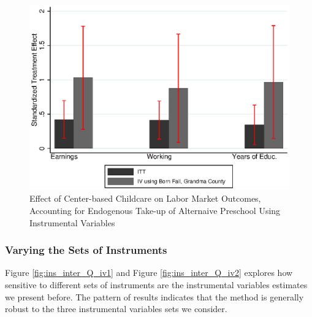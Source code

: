 \begin{appendices}
\begin{figure}[H]
		\caption{Effect of Center-based Childcare on Labor Market Outcomes, Accounting for Endogenous Take-up of Alternaive Preschool Using Instrumental Variables} \label{fig:mainiv2}
		\includegraphics[width=.5\columnwidth]{output/appendixplots/main_iv_other.eps}
\end{figure}

\subsubsection{Varying the Sets of Instruments}

\noindent Figure \ref{fig:ins_inter_Q_iv1} and Figure \ref{fig:ins_inter_Q_iv2} explores how sensitive to different sets of instruments are the instrumental variables estimates we present before. The pattern of results indicates that the method is generally robust to the three instrumental variables sets we consider. 


\end{appendices}
